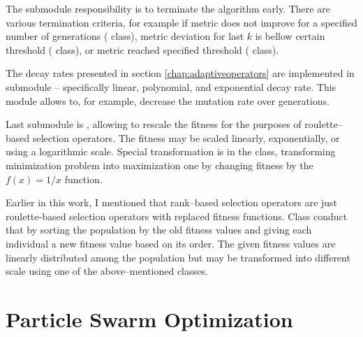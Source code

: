 The  submodule responsibility is to terminate the algorithm early. There are various termination criteria, for example if metric does not improve for a specified number of generations ( class), metric deviation for last $k$ is bellow certain threshold ( class), or metric reached specified threshold ( class).

The decay rates presented in section \ref{chap:adaptiveoperators} are implemented in submodule  -- specifically linear, polynomial, and exponential decay rate. This module allows to, for example, decrease the mutation rate over generations.

Last submodule is , allowing to rescale the fitness for the purposes of roulette--based selection operators. The fitness may be scaled linearly, exponentially, or using a logarithmic scale. Special transformation is in the  class, transforming minimization problem into maximization one by changing fitness by the $f(x)=1/x$ function.

Earlier in this work, I mentioned that rank--based selection operators are just roulette-based selection operators with replaced fitness functions. Class  conduct that by sorting the population by the old fitness values and giving each individual a new fitness value based on its order. The given fitness values are linearly distributed among the population but may be transformed into different scale using one of the above--mentioned classes.




\section{Particle Swarm Optimization}


